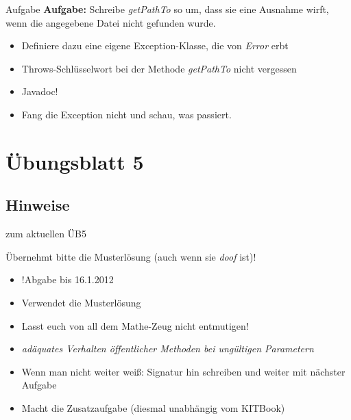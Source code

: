 \documentclass[18pt]{beamer}
\begin{document}
\begin{frame}{Aufgabe}
\textbf{Aufgabe:} Schreibe \emph{getPathTo} so um, dass sie eine Ausnahme wirft, wenn die angegebene Datei nicht gefunden wurde.

	\begin{itemize}
		\item Definiere dazu eine eigene Exception-Klasse, die von \emph{Error} erbt
		\item Throws-Schlüsselwort bei der Methode \emph{getPathTo} nicht vergessen
		\item Javadoc!
		\item Fang die Exception nicht und schau, was passiert.
	\end{itemize}
\end{frame}

\section{Übungsblatt 5}
\subsection*{Hinweise}
\begin{frame}{zum aktuellen ÜB5}

	Übernehmt bitte die Musterlösung (auch wenn sie \emph{doof} ist)!
	
	\begin{itemize}
		\item !Abgabe bis 16.1.2012
		\item Verwendet die Musterlösung
		\item Lasst euch von all dem Mathe-Zeug nicht entmutigen!
		\item \emph{adäquates Verhalten öffentlicher Methoden bei ungültigen Parametern}
		\item Wenn man nicht weiter weiß: Signatur hin schreiben und weiter mit nächster Aufgabe
		\item Macht die Zusatzaufgabe (diesmal unabhängig vom KITBook)
	\end{itemize}
\end{frame}

\end{document}
